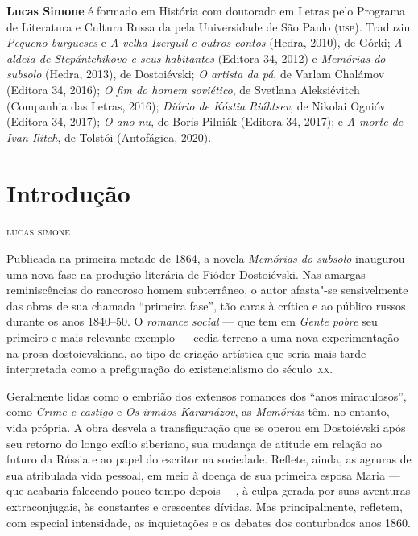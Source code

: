 \textbf{Lucas Simone} é formado em História com doutorado em Letras pelo Programa de Literatura e Cultura Russa da pela Universidade de São Paulo (\textsc{usp}). Traduziu \textit{Pequeno-burgueses} e \textit{A velha Izerguil e outros contos} (Hedra, 2010), de Górki; \textit{A aldeia de Stepántchikovo e seus habitantes} (Editora 34, 2012) e \textit{Memórias do subsolo} (Hedra, 2013), de Dostoiévski; \textit{O artista da pá}, de Varlam Chalámov (Editora 34, 2016); \textit{O fim do homem soviético}, de Svetlana Aleksiévitch (Companhia das Letras, 2016); \textit{Diário de Kóstia Riábtsev}, de Nikolai Ognióv (Editora 34, 2017); \textit{O ano nu}, de Boris Pilniák (Editora 34, 2017); e \textit{A morte de Ivan Ilitch}, de Tolstói (Antofágica, 2020).

\chapter{Introdução}


\textsc{lucas simone}


Publicada na primeira metade de 1864, a novela \textit{Memórias do subsolo}
inaugurou uma nova fase na produção literária de Fiódor Dostoiévski. Nas
amargas reminiscências do rancoroso homem subterrâneo, o autor afasta"-se
sensivelmente das obras de sua chamada ``primeira fase'', tão caras à crítica e
ao público russos durante os anos 1840--50. O \textit{romance social} --- que tem em
\textit{Gente pobre} seu primeiro e mais relevante exemplo --- cedia terreno a
uma nova experimentação na prosa dostoievskiana, ao tipo de criação artística
que seria mais tarde interpretada como a prefiguração do existencialismo do
século~\textsc{xx}.

Geralmente lidas como o embrião dos extensos romances dos ``anos miraculosos'',
como \textit{Crime e castigo} e \textit{Os irmãos Karamázov}, as
\textit{Memórias} têm, no entanto, vida própria. A obra desvela a
transfiguração que se operou em Dostoiévski após seu retorno do longo exílio
siberiano, sua mudança de atitude em relação ao futuro da Rússia e ao papel do
escritor na sociedade.  Reflete, ainda, as agruras de sua atribulada vida
pessoal, em meio à doença de sua primeira esposa Maria --- que acabaria falecendo
pouco tempo depois ---, à culpa gerada por suas aventuras extraconjugais, às
constantes e crescentes dívidas. Mas principalmente, refletem, com especial
intensidade, as inquietações e os debates dos conturbados anos 1860.

